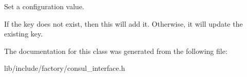 Set a configuration value. 

If the key does not exist, then this will add it. Otherwise, it will update the existing key. 

The documentation for this class was generated from the following file\-:\begin{DoxyCompactItemize}
\item 
lib/include/factory/consul\-\_\-interface.\-h\end{DoxyCompactItemize}
